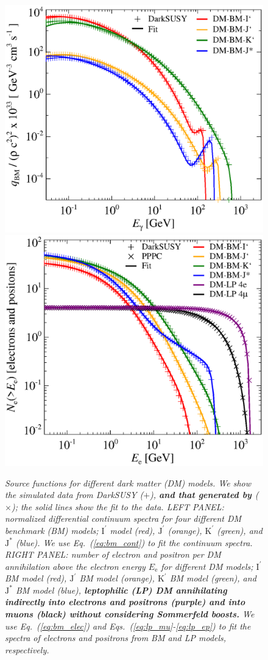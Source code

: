 \documentclass[10pt,aps,pra,reprint,amsmath,amsfonts,amssymb,showpacs,nofootinbib,floatfix]{revtex4-1}
\def\C#1{{\bf #1}}
\newcommand{\rmn}{\mathrm}
\newcommand{\ee}{E_\rmn{e}}
\newcommand{\Kp}{\rmn{K}^\prime}
\newcommand{\Ip}{\rmn{I}^\prime}
\newcommand{\Js}{\rmn{J}^*}
\newcommand{\Jp}{\rmn{J}^\prime}
\begin{document}
\begin{figure}
\begin{minipage}{2.0\columnwidth}
 \includegraphics[width=0.49\columnwidth]{figures/fit.ds.flux.eps}
 \includegraphics[width=0.49\columnwidth]{figures/fit.epflux.int.eps}
 \caption{\it Source functions for different dark matter (DM)
   models. We show the simulated data from {\sc DarkSUSY} \cite{ds}
   ($+$), \C{and that generated by
     \protect\cite{2011JCAP...03..019C,2011JCAP...03..051C}}
   ($\times$); the solid lines show the fit to the data. LEFT PANEL:
   normalized differential continuum spectra for four different DM
   benchmark (BM) models; $\Ip$ model (red), $\Jp$ (orange), $\Kp$
   (green), and $\Js$ (blue). We use Eq.~(\ref{eq:bm_cont}) to fit the
   continuum spectra. RIGHT PANEL: number of electron and positron per
   DM annihilation above the electron energy $\ee$ for different DM
   models; $\Ip$ BM model (red), $\Jp$ BM model (orange), $\Kp$ BM
   model (green), and $\Js$ BM model (blue), \C{leptophilic (LP) DM
     annihilating indirectly into electrons and positrons (purple) and
     into muons (black) without considering Sommerfeld boosts.} We use
   Eq.~(\ref{eq:bm_elec}) and Eqs.~(\ref{eq:lp_mu}-\ref{eq:lp_ep}) to
   fit the spectra of electrons and positrons from BM and LP models,
   respectively.}
 \label{fig:q_DM}
\end{minipage}
\end{figure}
\end{document}
